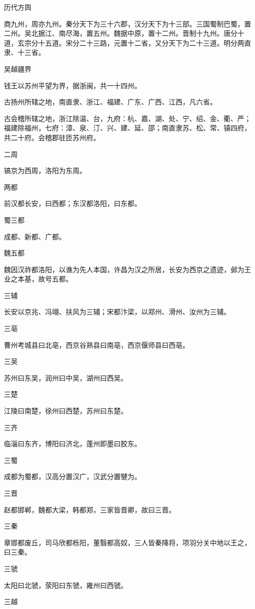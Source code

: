 \documentclass[a4paper,12pt,UTF8,twoside]{ctexbook}
\begin{document}
	历代方舆
	
	商九州，周亦九州。秦分天下为三十六郡，汉分天下为十三部。三国蜀制巴蜀，置二州。吴北据江、南尽海，置五州。魏据中原，置十二州。晋制十九州。唐分十道，玄宗分十五道。宋分二十三路，元置十二省，又分天下为二十三道。明分两直隶、十三省。
	
	吴越疆界
	
	钱王以苏州平望为界，据浙闽，共一十四州。
	
	古扬州所辖之地，南直隶、浙江、福建、广东、广西、江西，凡六省。
	
	古会稽所辖之地，浙江除温、台，九府：杭、嘉、湖、处、宁、绍、金、衢、严；福建除福州，七府：漳、泉、汀、兴、建、延、邵；南直隶苏、松、常、镇四府，共二十府。会稽郡驻匝苏州府。
	
	二周
	
	镐京为西周，洛阳为东周。
	
	两都
	
	前汉都长安，曰西都；东汉都洛阳，曰东都。
	
	蜀三都
	
	成都、新都、广都。
	
	魏五都
	
	魏因汉祚都洛阳，以谯为先人本国，许昌为汉之所居，长安为西京之遗迹，邺为王业之本基，故号五都。
	
	三辅
	
	长安以京兆、冯翊、扶风为三辅；宋都汴梁，以郑州、滑州、汝州为三辅。
	
	三亳
	
	曹州考城县曰北亳，西京谷熟县曰南亳，西京偃师县曰西亳。
	
	三吴
	
	苏州曰东吴，润州曰中吴，湖州曰西吴。
	
	三楚
	
	江陵曰南楚，徐州曰西楚，苏州曰东楚。
	
	三齐
	
	临淄曰东齐，博阳曰济北，蓬州即墨曰胶东。
	
	三蜀
	
	成都为蜀都，汉高分置汉广，汉武分置犍为。
	
	三晋
	
	赵都邯郸，魏都大梁，韩都郑，三家皆晋卿，故曰三晋。
	
	三秦
	
	章邯都废丘，司马欣都栎阳，董翳都高奴，三人皆秦降将，项羽分关中地以王之，曰三秦。
	
	三虢
	
	太阳曰北虢，荥阳曰东虢，雍州曰西虢。
	
	三越
	
\end{document}
